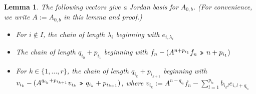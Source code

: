 \documentclass[12pt,psamsfonts]{article}
\newcommand{\leftshift}{\,\texttt{<<}\,}
\newcommand{\rightshift}{\mathbin{\rotatebox[origin=c]{180}{\leftshift}}}
\newtheorem{lemma}[theorem]{Lemma}
\begin{document}
\begin{lemma}
    The following vectors give a Jordan basis for \(A_{0,b}\).
    (For convenience, we write \(A := A_{0,b}\) in this lemma and proof.)
    \begin{itemize}
        \item For \(i \notin I\), the chain of length \(\lambda_i\) beginning with \(e_{i, \lambda_i}\)
        \item The chain of length \(q_{i_0} + p_{i_1}\) beginning with \(f_n - (A^{n + p_{i_1}}f_n \rightshift n + p_{i_1})\)
        \item For \(k \in \{1, ..., r\}\), the chain of length \(q_{i_k} + p_{i_{k + 1}}\) beginning with \(v_{i_k} - (A^{q_{i_k} + p_{i_{k + 1}}} v_{i_k} \rightshift q_{i_k} + p_{i_{k + 1}})\), where \(v_{i_k} := A^{n - q_{i_k}} f_n - \sum_{l = 1}^{p_{i_k}} b_{i_kl} e_{i,l + q_{i_k}}\)
    \end{itemize}
\end{lemma}
\end{document}
